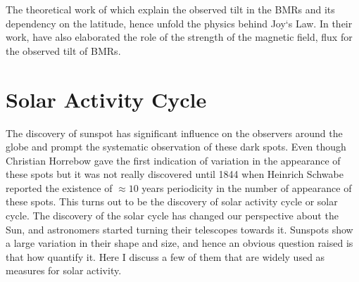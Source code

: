 The theoretical work of \citet{DSilva1993} which explain the observed tilt in the BMRs and its dependency on the latitude, hence unfold the physics behind Joy`s Law. In their work, \citet{DSilva1993} have also elaborated the role of the strength of the magnetic field, flux for the observed tilt of BMRs.


\section{Solar Activity Cycle}
The discovery of sunspot has significant influence on the observers around the globe and prompt the systematic observation of these dark spots. Even though Christian Horrebow gave the first indication of variation in the appearance of these spots but it was not really discovered until 1844 when Heinrich Schwabe \citep{Schwabe1844} reported the existence of $\approx 10$ years periodicity in the number of appearance of these spots. This turns out to be the discovery of solar activity cycle or solar cycle. The discovery of the solar cycle has changed our perspective about the Sun, and astronomers started turning their telescopes towards it. Sunspots show a large variation in their shape and size, and hence an obvious question raised is that how quantify it. Here I discuss a few of them  that are widely used as measures for solar activity.

 
